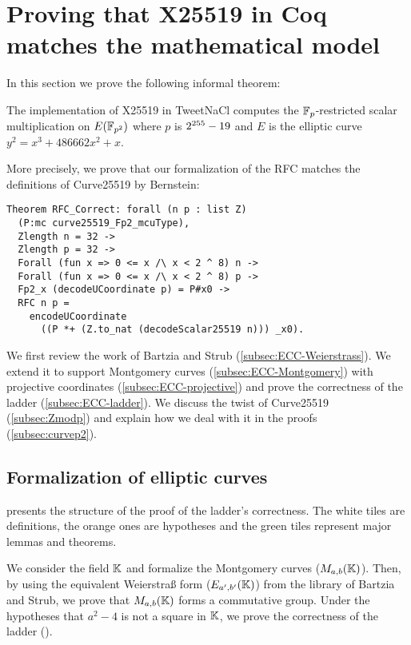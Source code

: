 \section{Proving that X25519 in Coq matches the mathematical model}
\label{sec:maths}

In this section we prove the following informal theorem:

\begin{informaltheorem}
  The implementation of X25519 in TweetNaCl computes the
  $\mathbb{F}_{p}$-restricted \xcoord scalar multiplication on $E(\mathbb{F}_{p^2})$ where $p$ is $2^{255}-19$
  and $E$ is the elliptic curve $y^2 = x^3 + 486662 x^2 + x$.
\end{informaltheorem}

More precisely, we prove that our formalization of the RFC matches the definitions of Curve25519 by Bernstein:
\begin{lstlisting}[language=Coq]
Theorem RFC_Correct: forall (n p : list Z)
  (P:mc curve25519_Fp2_mcuType),
  Zlength n = 32 ->
  Zlength p = 32 ->
  Forall (fun x => 0 <= x /\ x < 2 ^ 8) n ->
  Forall (fun x => 0 <= x /\ x < 2 ^ 8) p ->
  Fp2_x (decodeUCoordinate p) = P#x0 ->
  RFC n p =
    encodeUCoordinate
      ((P *+ (Z.to_nat (decodeScalar25519 n))) _x0).
\end{lstlisting}

We first review the work of Bartzia and Strub \cite{BartziaS14} (\ref{subsec:ECC-Weierstrass}).
We extend it to support Montgomery curves (\ref{subsec:ECC-Montgomery})
with projective coordinates (\ref{subsec:ECC-projective}) and prove the
correctness of the ladder (\ref{subsec:ECC-ladder}).
We discuss the twist of Curve25519 (\ref{subsec:Zmodp}) and explain how we deal
with it in the proofs (\ref{subsec:curvep2}).

\subsection{Formalization of elliptic curves}
\label{subsec:ECC}

 presents the structure of the proof of the ladder's
correctness. The white tiles are definitions, the orange ones are hypotheses and
the green tiles represent major lemmas and theorems.

We consider the field $\mathbb{K}$ and formalize the Montgomery curves ($M_{a,b}(\mathbb{K})$).
Then, by using the equivalent Weierstra{\ss} form ($E_{a',b'}(\mathbb{K})$) from the library of Bartzia and Strub,
we prove that $M_{a,b}(\mathbb{K})$ forms a commutative group.
Under the hypotheses that
$a^2 - 4$ is not a square in $\mathbb{K}$, we prove the correctness of the ladder ().

